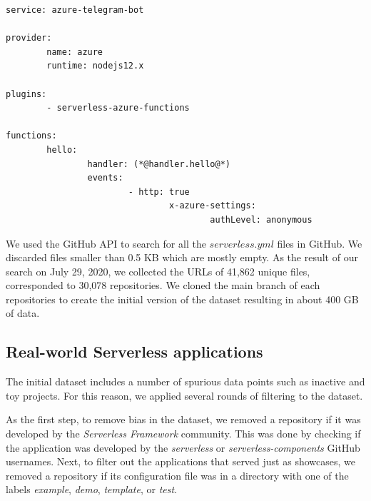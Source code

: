 \begin{minipage}{\linewidth}
\begin{lstlisting}[frame=single, caption=An example of a serverless.yml configuration file., label={lst:example}, captionpos=b]
service: azure-telegram-bot 

provider:  
		name: azure
		runtime: nodejs12.x  

plugins:  
		- serverless-azure-functions 

functions:
		hello:    
				handler: (*@handler.hello@*)
				events:   
						- http: true        
								x-azure-settings:          
										authLevel: anonymous
\end{lstlisting}
\end{minipage}

\vspace{2mm}

We used the GitHub API to search for all the $serverless.yml$ files in GitHub. 
We discarded files smaller than 0.5 KB which are mostly empty.
As the result of our search on July 29, 2020, 
we collected the URLs of 41,862 unique files, corresponded to 
30,078 repositories. We cloned the main branch of each repositories to 
create the initial version of the dataset resulting in about 400 GB of data.

\subsection{Real-world Serverless applications} \label{phaseB}
The initial dataset includes a number of spurious data points 
such as inactive and toy projects. For this reason, we applied 
several rounds of filtering to the dataset.

As the first step, to remove bias in the dataset, we removed a 
repository if it was developed by the \emph{Serverless Framework} community. 
This was done by checking if the application was developed by the \emph{serverless} 
or \emph{serverless-components} GitHub usernames.
Next, to filter out the applications 
that served just as showcases, we removed a repository if its configuration file 
was in a directory with one of the labels 
\emph{example}, \emph{demo}, \emph{template}, or \emph{test}.

